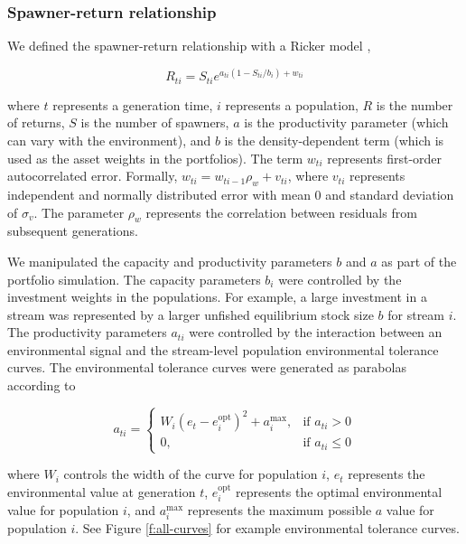 \subsubsection{Spawner-return relationship}

We defined the spawner-return relationship with a Ricker model
\citep{ricker1954},

\begin{equation}
R_{ti} = S_{ti}e^{a_{ti}(1-S_{ti}/b_i) + w_{ti}}
\end{equation}

\noindent where $t$ represents a generation time, $i$ represents a
population, $R$ is the number of returns, $S$ is the number of spawners,
$a$ is the productivity parameter (which can vary with the environment),
and $b$ is the density-dependent term (which is used as the asset
weights in the portfolios). The term $w_{ti}$ represents first-order
autocorrelated error. Formally, $w_{ti} = w_{ti-1} \rho_w + v_{ti}$,
where $v_{ti}$ represents independent and normally distributed error
with mean 0 and standard deviation of $\sigma_v$. The parameter $\rho_w$
represents the correlation between residuals from subsequent
generations.

We manipulated the capacity and productivity parameters $b$ and $a$ as
part of the portfolio simulation. The capacity parameters $b_i$ were
controlled by the investment weights in the populations. For example, a
large investment in a stream was represented by a larger unfished
equilibrium stock size $b$ for stream $i$. The productivity parameters
$a_{ti}$ were controlled by the interaction between an environmental
signal and the stream-level population environmental tolerance curves.
The environmental tolerance curves were generated as parabolas according
to

\begin{equation}
  a_{ti} =
  \begin{cases}
    W_i (e_t - e_i^{\mathrm{opt}})^2 + a_i^{\mathrm{max}},
      & \text{if } a_{ti} > 0\\
      0, & \text{if } a_{ti} \leq 0
  \end{cases}
\end{equation}

\noindent where $W_i$ controls the width of the curve for population
$i$, $e_t$ represents the environmental value at generation $t$,
$e_i^{\mathrm{opt}}$ represents the optimal environmental value for
population $i$, and $a_i^{\mathrm{max}}$ represents the maximum possible
$a$ value for population $i$. See Figure \ref{f:all-curves} for example
environmental tolerance curves.

